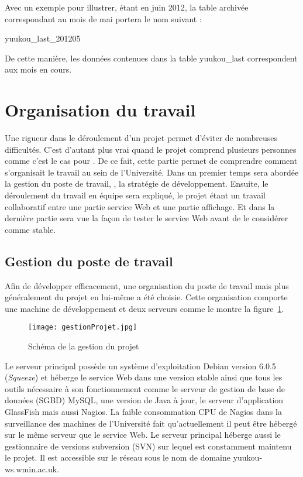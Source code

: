 Avec un exemple pour illustrer, \'etant en juin 2012, la table archiv\'ee correspondant au mois de mai portera le nom suivant : 

\begin{center}
	\textsf{yuukou\_last\_201205}

\end{center}

De cette mani\`ere, les donn\'ees contenues dans la table \textsf{yuukou\_last} correspondent aux mois en cours.


\section{Organisation du travail}

Une rigueur dans le d\'eroulement d'un projet permet d'\'eviter de nombreuses difficult\'es.
C'est d'autant plus vrai quand le projet comprend plusieurs personnes comme c'est le cas pour {\YuukouII}.
De ce fait, cette partie permet de comprendre comment s'organisait le travail au sein de l'Universit\'e.
Dans un premier temps sera abord\'ee la gestion du poste de travail, \cad, la strat\'egie de d\'eveloppement.
Ensuite, le d\'eroulement du travail en \'equipe sera expliqu\'e, le projet \'etant un travail collaboratif entre une partie service Web et une partie affichage.
Et dans la derni\`ere partie sera vue la fa\c{c}on de tester le service Web avant de le consid\'erer comme stable.

\subsection{Gestion du poste de travail}
\label{section:gestionProjet}

Afin de d\'evelopper efficacement, une organisation du poste de travail mais plus g\'en\'eralement du projet en lui-m\^eme a \'et\'e choisie.
Cette organisation comporte une machine de d\'eveloppement et deux serveurs comme le montre la figure~\ref{figure:gestionProjet}.

\begin{figure}[!ht]
	\centering
	\texttt{[image: gestionProjet.jpg]}
	\caption{Sch\'ema de la gestion du projet}
	\label{figure:gestionProjet}

\end{figure}

Le serveur principal poss\`ede un syst\`eme d'exploitation Debian version 6.0.5 (\textit{Squeeze}) et h\'eberge le service Web dans une version stable ainsi que tous les outils n\'ecessaire \`a son fonctionnement comme le serveur de gestion de base de donn\'ees (SGBD) MySQL, une version de Java \`a jour, le serveur d'application GlassFish mais aussi Nagios.
La faible consommation CPU de Nagios dans la surveillance des machines de l'Universit\'e fait qu'actuellement il peut \^etre h\'eberg\'e sur le m\^eme serveur que le service Web.
Le serveur principal h\'eberge aussi le gestionnaire de versions subversion (SVN) sur lequel est constamment maintenu le projet.
Il est accessible sur le r\'eseau sous le nom de domaine \textsf{yuukou-ws.wmin.ac.uk}.

